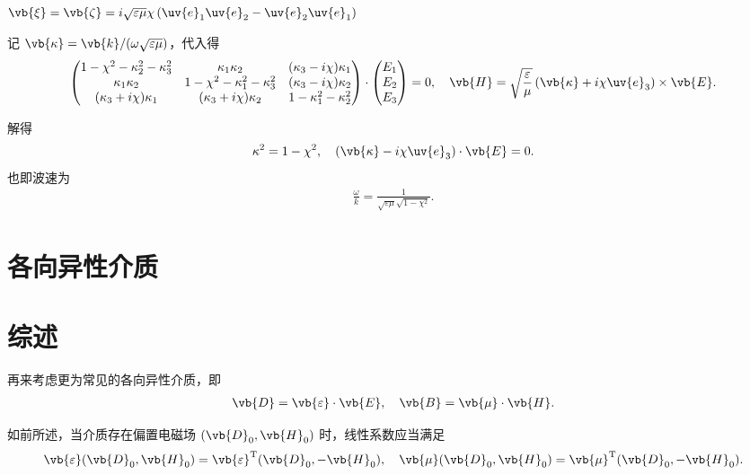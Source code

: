 \begin{exbox}
	\(\vb{\xi}=\vb{\zeta}=i\sqrt{\varepsilon\mu}\chi\left(\uv{e}_1\uv{e}_2 - \uv{e}_2\uv{e}_1\right)\)

	记 \(\vb{\kappa}=\vb{k}/(\omega\sqrt{\varepsilon\mu})\)，代入得
	\begin{align*}
		\begin{pmatrix}
			1-\chi^2-\kappa_2^2-\kappa_3^2 & \kappa_1\kappa_2               & (\kappa_3-i\chi)\kappa_1 \\
			\kappa_1\kappa_2               & 1-\chi^2-\kappa_1^2-\kappa_3^2 & (\kappa_3-i\chi)\kappa_2 \\
			(\kappa_3+i\chi)\kappa_1       & (\kappa_3+i\chi)\kappa_2       & 1-\kappa_1^2-\kappa_2^2
		\end{pmatrix}\cdot\begin{pmatrix}E_1 \\ E_2 \\ E_3\end{pmatrix}=0,\quad
		\vb{H} = \sqrt{\frac{\varepsilon}{\mu}}\left(\vb{\kappa} + i\chi\uv{e}_3\right)\times\vb{E}.
	\end{align*}

	解得
	\begin{align*}
		\kappa^2=1-\chi^2,\quad \left(\vb{\kappa}-i\chi\uv{e}_3\right)\cdot\vb{E}=0.
	\end{align*}
	也即波速为
	\begin{align*}
		\frac{\omega}{k} = \frac{1}{\sqrt{\varepsilon\mu}\sqrt{1-\chi^2}}.
	\end{align*}
\end{exbox}

\section{各向异性介质}
\section{综述}

再来考虑更为常见的各向异性介质，即
\begin{align*}
	\vb{D}=\vb{\varepsilon}\cdot\vb{E},\quad \vb{B}=\vb{\mu}\cdot\vb{H}.
\end{align*}

如前所述，当介质存在偏置电磁场 \((\vb{D}_0, \vb{H}_0)\) 时，线性系数应当满足
\begin{align*}
	\vb{\varepsilon}(\vb{D}_0, \vb{H}_0) = \vb{\varepsilon}^\mathrm{T}(\vb{D}_0, -\vb{H}_0),\quad
	\vb{\mu}(\vb{D}_0, \vb{H}_0) = \vb{\mu}^\mathrm{T}(\vb{D}_0, -\vb{H}_0).
\end{align*}

